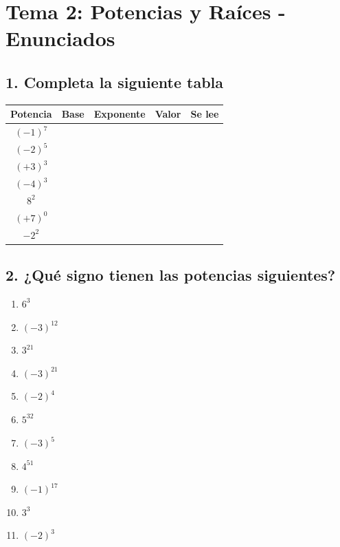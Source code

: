 \documentclass[a4paper,12pt]{article}
\begin{document}
\section*{Tema 2: Potencias y Raíces - Enunciados}

\subsection*{1. Completa la siguiente tabla}

\begin{center}
\renewcommand{\arraystretch}{1.5}
\begin{tabular}{|c|c|c|c|c|}
\hline
\textbf{Potencia} & \textbf{Base} & \textbf{Exponente} & \textbf{Valor} & \textbf{Se lee} \\ \hline
$(-1)^{7}$ & & & & \\ \hline
$(-2)^{5}$ & & & & \\ \hline
$(+3)^{3}$ & & & & \\ \hline
$(-4)^{3}$ & & & & \\ \hline
$8^{2}$ & & & & \\ \hline
$(+7)^{0}$ & & & & \\ \hline
$-2^{2}$ & & & & \\ \hline
\end{tabular}
\end{center}

\vspace{0.5cm}

\subsection*{2. ¿Qué signo tienen las potencias siguientes?}

\begin{enumerate}[label=\alph*)]
    \item $6^{3}$
    \item $(-3)^{12}$
    \item $3^{21}$
    \item $(-3)^{21}$
    \item $(-2)^{4}$
    \item $5^{32}$
    \item $(-3)^{5}$
    \item $4^{51}$
    \item $(-1)^{17}$
    \item $3^{3}$
    \item $(-2)^{3}$
\end{enumerate}
\end{document}
